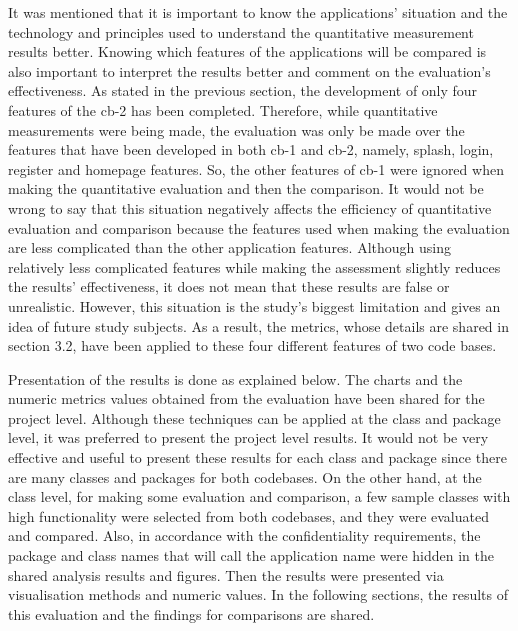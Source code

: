It was mentioned that it is important to know the applications' situation and the technology and principles used to understand the quantitative measurement results better. Knowing which features of the applications will be compared is also important to interpret the results better and comment on the evaluation's effectiveness. As stated in the previous section, the development of only four features of the cb-2 has been completed. Therefore, while quantitative measurements were being made, the evaluation was only be made over the features that have been developed in both cb-1 and cb-2, namely, splash, login, register and homepage features. So, the other features of cb-1 were ignored when making the quantitative evaluation and then the comparison. It would not be wrong to say that this situation negatively affects the efficiency of quantitative evaluation and comparison because the features used when making the evaluation are less complicated than the other application features. Although using relatively less complicated features while making the assessment slightly reduces the results' effectiveness, it does not mean that these results are false or unrealistic. However, this situation is the study's biggest limitation and gives an idea of future study subjects. As a result, the metrics, whose details are shared in section 3.2, have been applied to these four different features of two code bases. 

Presentation of the results is done as explained below. The charts and the numeric metrics values obtained from the evaluation have been shared for the project level. Although these techniques can be applied at the class and package level, it was preferred to present the project level results. It would not be very effective and useful to present these results for each class and package since there are many classes and packages for both codebases. On the other hand, at the class level, for making some evaluation and comparison, a few sample classes with high functionality were selected from both codebases, and they were evaluated and compared. Also, in accordance with the confidentiality requirements, the package and class names that will call the application name were hidden in the shared analysis results and figures. Then the results were presented via visualisation methods and numeric values. In the following sections, the results of this evaluation and the findings for comparisons are shared.